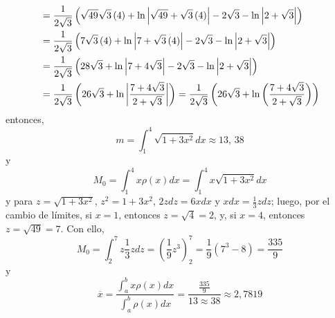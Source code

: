 

{\small
\begin{align*}
&=\frac{1}{2\sqrt{3}}\left( \sqrt{49^{{}}}\sqrt{3}\left( 4\right) +\ln
\left\vert \sqrt{49^{{}}}+\sqrt{3}\left( 4\right) \right\vert -2\sqrt{3}-\ln
\left\vert 2+\sqrt{3}\right\vert \right) \\
&=\frac{1}{2\sqrt{3}}\left( 7\sqrt{3}\left( 4\right) +\ln \left\vert 7+\sqrt{%
	3}\left( 4\right) \right\vert -2\sqrt{3}-\ln \left\vert 2+\sqrt{3}%
\right\vert \right) \\
&=\frac{1}{2\sqrt{3}}\left( 28\sqrt{3}+\ln \left\vert 7+4\sqrt{3}\right\vert
-2\sqrt{3}-\ln \left\vert 2+\sqrt{3}\right\vert \right)\\
& =\frac{1}{2\sqrt{3}}%
\left( 26\sqrt{3}+\ln \left\vert \frac{7+4\sqrt{3}}{2+\sqrt{3}}\right\vert
\right) =\frac{1}{2\sqrt{3}}\left( 26\sqrt{3}+\ln \left( \frac{7+4\sqrt{3}}{%
	2+\sqrt{3}}\right) \right)
\end{align*}
}
entonces,
\[
m=\int_{1}^{4}\sqrt{1+3x^{2}}dx\approx13,\,38
\]
y
\[
M_{0}=\int_{1}^{4}x\rho \left( x\right) dx=\int_{1}^{4}x\sqrt{1+3x^{2}}dx
\]
y para $z=\sqrt{1+3x^{2}}$, $z^{2}=1+3x^{2}$, $2zdz=6xdx$ y $xdx=\frac{1}{3}zdz$; luego, por el cambio de límites, si $x=1$, entonces $z=\sqrt{4}=2$, y, si $x=4$, entonces $z=\sqrt{49}=7$. Con ello,
\[
M_{0}=\int_{2}^{7}z\frac{1}{3}zdz=\left( \frac{1}{9}z^{3}\right) _{2}^{7}=%
\frac{1}{9}\left( 7^{3}-8\right) =\frac{335}{9}
\]
y
\[
\overline{x}=\frac{\int_{a}^{b}x\rho \left( x\right) dx}{\int_{a}^{b}\rho \left( x\right)
	dx}=\frac{\frac{335}{9}}{13\approx 38}\approx 2,7819
\]

